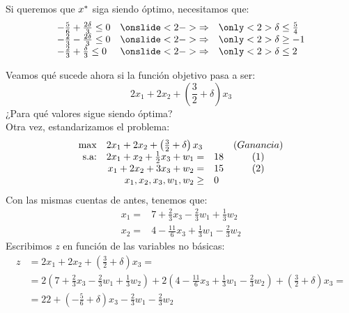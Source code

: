 \documentclass[10pt, aspectratio=169]{beamer}
\begin{document}
\begin{frame}{}
    Si queremos que $x^{\ast}$ siga siendo óptimo, necesitamos que:
    \[
    \begin{array}{lcl}
        -\frac{5}{6}+\frac{2\delta}{3} \leq 0 & \onslide<2->{\Rightarrow} & \only<2>{\delta\leq \frac{5}{4}} \\
        -\frac{2}{3}-\frac{2\delta}{3} \leq 0 & \onslide<2->{\Rightarrow} & \only<2>{\delta\geq -1} \\
        -\frac{2}{3}+\frac{\delta}{3} \leq 0 & \onslide<2->{\Rightarrow} & \only<2>{\delta\leq 2} \\
    \end{array}
    \]
\end{frame}

\begin{frame}{} \footnotesize
    Veamos qué sucede ahora si la función objetivo pasa a ser:
    \[2x_1+2x_2+\left(\frac{3}{2}+\delta\right)x_3\]
    ¿Para qué valores sigue siendo óptima?\\
    Otra vez, estandarizamos el problema:
    $$
    \begin{array}{rrlc}
    \max & \multicolumn{2}{l}{2x_1+2x_2+\left(\frac{3}{2}+\delta\right)x_3} & (Ganancia)\\
    \text{s.a:}& 2x_1+x_2+\frac{1}{2}x_3 + w_1 = & 18 & (1)\\
     & x_1+2x_2+3x_3 + w_2 = & 15 & (2)\\
     & x_1, x_2, x_3, w_1, w_2\geq & 0 \\
    \end{array}
    $$
    Con las mismas cuentas de antes, tenemos que:
    \begin{align*}
        x_1 = & 7 + \frac{2}{3}x_3-\frac{2}{3}w_1+\frac{1}{3}w_2 \\
        x_2 = & 4-\frac{11}{6}x_3+\frac{1}{3}w_1-\frac{2}{3}w_2
    \end{align*}
    Escribimos $z$ en función de las variables no básicas:
    \begin{align*}
        z & = 2x_1+2x_2+\left(\frac{3}{2}+\delta\right)x_3 = \\
         & =2\left(7 + \frac{2}{3}x_3-\frac{2}{3}w_1+\frac{1}{3}w_2\right)+2\left(4-\frac{11}{6}x_3+\frac{1}{3}w_1-\frac{2}{3}w_2\right)+\left(\frac{3}{2}+\delta\right)x_3 = \\
         & = 22 +\left(-\frac{5}{6}+\delta\right)x_3-\frac{2}{3}w_1-\frac{2}{3}w_2
    \end{align*}
\end{frame}
\end{document}
